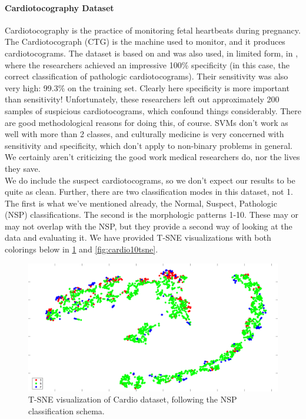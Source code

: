 \paragraph{Cardiotocography Dataset}
Cardiotocography is the practice of monitoring fetal heartbeats during pregnancy.  The Cardiotocograph (CTG) is the machine used to monitor, and it produces cardiotocograms.    The dataset is based on \cite{ayres-de-campos_sisporto_2000} and was also used, in limited form, in \cite{ocak_medical_2013}, where the researchers achieved an impressive 100\% specificity (in this case, the correct classification of pathologic cardiotocograms).  Their sensitivity was also very high: 99.3\% on the training set.  Clearly here specificity is more important than sensitivity!  Unfortunately, these researchers left out approximately 200 samples of suspicious cardiotocograms, which confound things considerably.  There are good methodological reasons for doing this, of course.  SVMs don't work as well with more than 2 classes, and culturally medicine is very concerned with sensitivity and specificity, which don't apply to non-binary problems in general.  We certainly aren't criticizing the good work medical researchers do, nor the lives they save.\\
We do include the suspect cardiotocograms, so we don't expect our results to be quite as clean. Further, there are two classification modes in this dataset, not 1.  The first is what we've mentioned already, the Normal, Suspect, Pathologic (NSP) classifications.  The second is the morphologic patterns 1-10.  These may or may not overlap with the NSP, but they provide a second way of looking at the data and evaluating it.  We have provided T-SNE visualizations with both colorings below in \ref{fig:cardio3tsne} and \ref{fig:cardio10tsne}.
\begin{figure}
	\centering
	\includegraphics[width=0.9\linewidth]{figures/png/Cardio3TSNE}
	\caption[T-SNE visualization of Cardio dataset, NSP]{T-SNE visualization of Cardio dataset, following the NSP classification schema.}
	\label{fig:cardio3tsne}
\end{figure}

